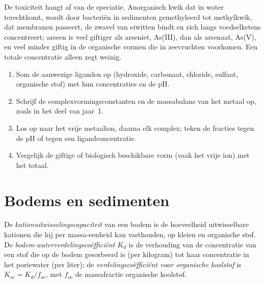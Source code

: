 De toxiciteit hangt af van de speciatie. Anorganisch kwik dat in water
terechtkomt, wordt door bacteriën in sedimenten gemethyleerd tot
methylkwik, dat membranen passeert, de zwavel van eiwitten bindt en zich
langs voedselketens concentreert; arseen is veel giftiger als arseniet,
As(III), dan als arsenaat, As(V), en veel minder giftig in de organische
vormen die in zeevruchten voorkomen. Een totale concentratie alleen zegt
weinig.

\begin{method}\label{met:b3:environmental-toxicology:speciation}
\begin{enumerate}
  \item Som de aanwezige liganden op (hydroxide, carbonaat, chloride,
        sulfaat, organische stof) met hun concentraties en de pH.
  \item Schrijf de complexvormingsconstanten en de massabalans van het
        metaal op, zoals in het deel van jaar~1.
  \item Los op naar het vrije metaalion, daarna elk complex; teken de
        fracties tegen de pH of tegen een ligandconcentratie.
  \item Vergelijk de giftige of biologisch beschikbare vorm (vaak het
        vrije ion) met het totaal.
\end{enumerate}
\end{method}

\section{Bodems en sedimenten}

\begin{definition}\label{def:b3:environmental-toxicology:soil}
De \emph{kationuitwisselingscapaciteit}
van een bodem is de hoeveelheid uitwisselbare kationen die hij per
massa-eenheid kan vasthouden, op kleien en organische stof. De
\emph{bodem-waterverdelingscoëfficiënt}
$K_d$ is de verhouding van de concentratie van een stof die op de bodem
gesorbeerd is (per kilogram) tot haar concentratie in het poriewater (per
liter); de
\emph{verdelingscoëfficiënt voor organische koolstof}
is $K_{oc} = K_d/f_{oc}$, met $f_{oc}$ de massafractie organische koolstof.
\end{definition}

